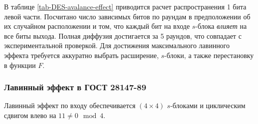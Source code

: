 В таблице \ref{tab-DES-avalance-effect} приводится расчет распространения 1 бита левой части. Посчитано число зависимых битов по раундам в предположении об их случайном расположении и том, что каждый бит на входе $s$-блока \emph{влияет} на все биты выхода. Полная диффузия достигается за 5 раундов, что совпадает с экспериментальной проверкой. Для достижения максимального лавинного эффекта требуется аккуратно выбрать расширение, $s$-блоки, а также перестановку в функции $F$.


\subsubsection{Лавинный эффект в ГОСТ 28147-89}

Лавинный эффект по входу обеспечивается $(4 \times 4)$ $s$-блоками и циклическим сдвигом влево на $11 \neq 0 \mod 4$.

\begin{table}[!ht]
    \centering
    \caption{Распространение влияния 1 бита левой части в ГОСТ 28147-89\label{tab:GOST-avalance-effect}}
\end{table}

